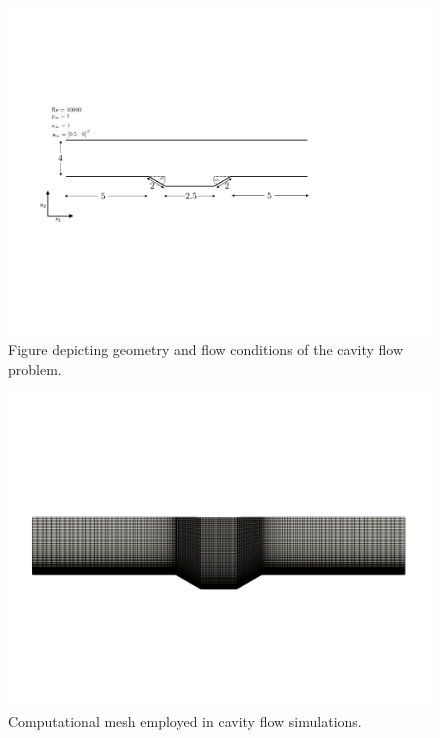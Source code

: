 \begin{figure}
\begin{center}
\includegraphics[trim={2cm 7cm 4cm 6cm},clip,width=0.95\linewidth]{cav_fig.pdf}
\caption{Figure depicting geometry and flow conditions of the cavity flow problem.} 
\label{fig:cav_fig}
\end{center}
\end{figure}

\begin{figure}
\begin{center}
\includegraphics[trim={0cm 14cm 0cm 14cm},clip,width=1.\linewidth]{figs/cavity/grid.png}
\caption{Computational mesh employed in cavity flow simulations.}
\label{fig:cav_mesh}
\end{center}
\end{figure}


